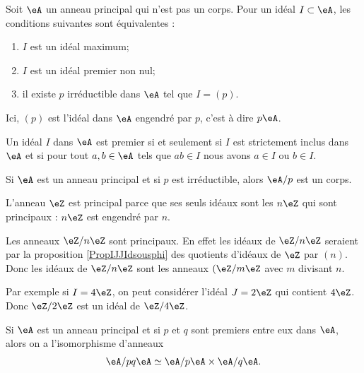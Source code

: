 \begin{proposition} \label{PropomqcGe}
    Soit \( \eA\) un anneau principal qui n'est pas un corps. Pour un idéal \( I\subset \eA\), les conditions suivantes sont équivalentes :
    \begin{enumerate}
        \item
            \( I\) est un idéal maximum;
        \item
            \( I\) est un idéal premier non nul;
        \item
            il existe \( p\) irréductible dans \( \eA\) tel que \( I=(p)\).
    \end{enumerate}
\end{proposition}
Ici, \( (p)\) est l'idéal dans \( \eA\) engendré par \( p\), c'est à dire \( p\eA\).

\begin{proposition}
    Un idéal \( I\) dans \( \eA\) est premier si et seulement si \( I\) est strictement inclus dans \( \eA\) et si pour tout \( a,b\in\eA\) tels que \( ab\in I\) nous avons \( a\in I\) ou \( b\in I\).
\end{proposition}

\begin{proposition}     \label{PropoTMMXCx}
    Si \( \eA\) est un anneau principal et si \( p\) est irréductible, alors \( \eA/p\) est un corps.
\end{proposition}

\begin{example}
    L'anneau \( \eZ\) est principal parce que ses seuls idéaux sont les \( n\eZ\) qui sont principaux : \( n\eZ\) est engendré par \( n\).
\end{example}

\begin{example}
    Les anneaux \( \eZ/n\eZ\) sont principaux. En effet les idéaux de \( \eZ/n\eZ\) seraient par la proposition \ref{PropIJJIdsousphi} des quotients d'idéaux de \( \eZ\) par \( (n)\). Donc les idéaux de \( \eZ/n\eZ\) sont les anneaux \( (\eZ/m\eZ\) avec \( m\) divisant \( n\).

    Par exemple si \( I=4\eZ\), on peut considérer l'idéal \( J=2\eZ\) qui contient \( 4\eZ\). Donc \( \eZ/2\eZ\) est un idéal de \( \eZ/4\eZ\).
\end{example}

\begin{theorem}        \label{ThofPXwiM}
    Si \( \eA\) est un anneau principal et si \( p\) et \( q\) sont premiers entre eux dans \( \eA\), alors on a l'isomorphisme d'anneaux
    \begin{equation}
        \eA/pq\eA\simeq \eA/p\eA\times \eA/q\eA.
    \end{equation}
\end{theorem}

